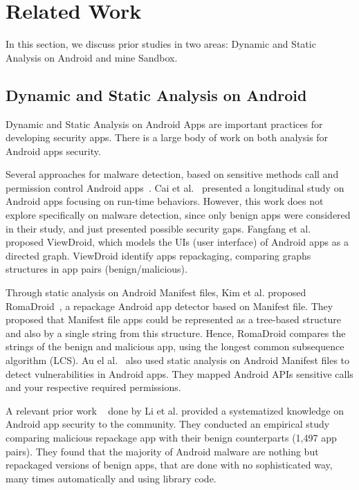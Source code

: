 \section{Related Work}\label{sec:relatedwork}
In this section, we discuss prior studies in two areas: Dynamic and Static Analysis on Android and mine Sandbox.

\subsection{Dynamic and Static Analysis on Android}\label{sec:analysis}

Dynamic and Static Analysis on Android Apps are important practices for developing security apps. There is a large body of work on both analysis for Android apps security. 

Several approaches for malware detection, based on sensitive methods call and permission control Android apps~\cite{DBLP:conf/mobicom/WeiGNF12,DBLP:conf/asiajcis/WuMWLW12,DBLP:conf/sp/LiDLDG21}. Cai et al.~\cite{DBLP:journals/tse/CaiR21} presented a longitudinal study on Android apps focusing on run-time behaviors. However, this work does not explore specifically on malware detection, since only benign apps were considered in their study, and just presented possible security gaps. Fangfang et al.~\cite{DBLP:conf/wisec/ZhangHZW014} proposed ViewDroid, which models the UIs (user interface) of Android apps as a directed graph. ViewDroid identify apps repackaging, comparing graphs structures in app pairs (benign/malicious).

Through static analysis on Android Manifest files, Kim et al. proposed RomaDroid~\cite{DBLP:journals/access/KimLCP19}, a repackage Android app detector based on Manifest file. They proposed that Manifest file apps could be represented as a tree-based structure and also by a single string from this structure. Hence, RomaDroid compares the strings of the benign and malicious app, using the longest common subsequence algorithm (LCS). Au el al.~\cite{DBLP:conf/ccs/AuZHL12} also used static analysis on Android Manifest files to detect vulnerabilities in Android apps. They mapped Android APIs sensitive calls and your respective required permissions.

A relevant prior work ~\cite{DBLP:journals/tifs/0029LBKTLC17} done by Li et al. provided a systematized knowledge
on Android app security to the community. They conducted an empirical study comparing malicious repackage app with their benign counterparts (1,497 app pairs). They found that the majority of Android malware are nothing but repackaged versions of benign apps, that are done with no sophisticated way, many times automatically and using library code.

